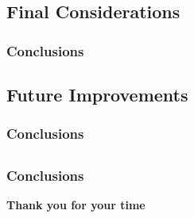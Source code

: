\subsection{Final Considerations}

\begin{frame}
    \frametitle{Conclusions}

    
\end{frame}

\subsection{Future Improvements}

\begin{frame}
    \frametitle{Conclusions}


\end{frame}

\subsection{}

\begin{frame}
    \frametitle{Conclusions}

    \vspace*{\fill}
    \begin{center}
        \Huge{\textbf{Thank you for your time}}
    \end{center}
    \vspace*{\fill}
    
\end{frame}
